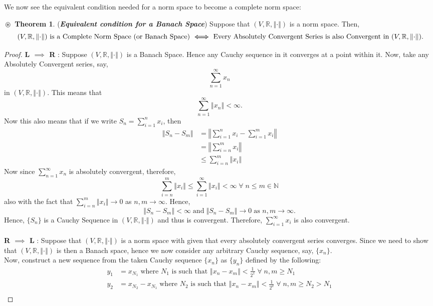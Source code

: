 \documentclass{article}
\theoremstyle{definition}
\newtheorem{theorem}{$\boxed{\boxed{\circledast}}$ Theorem}
\theoremstyle{remark}
\theoremstyle{definition}
\theoremstyle{definition}
\theoremstyle{definition}
\newcommand{\norm}[1]{\left \Vert #1 \right \Vert}
\newcommand{\R}{\mathbb{R}}
\newcommand{\N}{\mathbb{N}}
\begin{document}
We now see the equivalent condition needed for a norm space to become a complete norm space:
\begin{theorem}\label{T-10}
	(\textbf{\emph{Equivalent condition for a Banach Space}}) Suppose that $ (V,\R,\norm{\cdot}) $ is a norm space. Then,
	\[\text{ $ (V,\R,\norm{\cdot}) $ is a Complete Norm Space (or Banach Space) $ \bm{\iff} $ Every Absolutely Convergent Series is also Convergent in $ (V,\R,\norm{\cdot}) $.}\]
\end{theorem}
\begin{proof}
	\textbf{L $ \implies  $ R} : Suppose $ (V,\R,\norm{\cdot}) $ is a Banach Space. Hence any Cauchy sequence in it converges at a point within it. Now, take any Absolutely Convergent series, say,
	\[\sum_{n=1}^{\infty} x_n\]
	in $ (V,\R, \norm{\cdot}) $. This means that
	\[\sum_{n=1}^{\infty}\norm{x_n} < \infty.\]
	Now this also means that if we write $ S_n = \sum_{i=1}^{n} x_i $, then 
	\begin{align*}
		\norm{S_n - S_m} &= \norm{\sum_{i=1}^{n} x_i - \sum_{i=1}^{m} x_i}\\
		&= \norm{\sum_{i=n}^{m} x_i }\\
		&\le \sum_{i=n}^{m} \norm{x_i}
	\end{align*}
Now since $ \sum_{n=1}^{\infty} x_n$ is absolutely convergent, therefore, 
\[\sum_{i=n}^{m} \norm{x_i} \le \sum_{i=1}^{\infty} \norm{x_i} < \infty\;\forall\;n\le m\in\N \]
also with the fact that $ \sum_{i=n}^{m} \norm{x_i} \longrightarrow 0$ as $ n,m \to \infty $.
Hence,
\[\norm{S_n-S_m} < \infty \;\text{and}\;\norm{S_n-S_m}\to 0 \;\text{as }n,m\to \infty.\]
Hence, $ \{S_n\} $ is a Cauchy Sequence in $ (V,\R,\norm{\cdot}) $ and thus is convergent. Therefore, $ \sum_{i=1}^{\infty}x_i $ is also convergent.\\\\
\textbf{R $ \implies  $ L} : Suppose that $ (V,\R,\norm{\cdot}) $ is a norm space with given that every absolutely convergent series converges. Since we need to show that $ (V,\R,\norm{\cdot}) $ is then a Banach space, hence we now consider any arbitrary Cauchy sequence, say, $ \{x_n\} $.\\
Now, construct a new sequence from the taken Cauchy sequence $ \{x_n\} $ as $ \{y_n\} $ defined by the following:
\begin{align*}
	y_1 &= x_{N_1} \;\text{where } N_1 \text{ is such that } \norm{x_n - x_m} < \frac{1}{2^{1}}  \;\forall\; n,m\ge N_1\\
		y_2 &= x_{N_2} - x_{N_1} \;\text{where } N_2 \text{ is such that } \norm{x_n - x_m} < \frac{1}{2^{2}}  \;\forall\; n,m\ge N_2 > N_1\\

\end{align*}
\end{proof}
\end{document}
